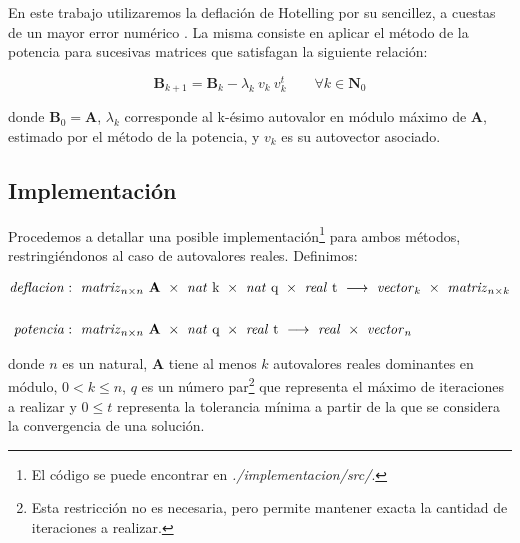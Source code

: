 En este trabajo utilizaremos la deflación de Hotelling por su sencillez, a cuestas de un mayor error numérico \cite{Burden}. La misma consiste en aplicar el método de la potencia para sucesivas matrices que satisfagan la siguiente relación:

\vspace{1em}
\begin{equation} \label{deflacion}
    \mathbf{B}_{k+1} = \mathbf{B}_{k} - \lambda_k\ v_k\ v_k^t \qquad \forall k \in \mathbf{N}_0
\end{equation}

\vspace{2em}
\noindent donde $\mathbf{B}_0 = \mathbf{A}$, $\lambda_k$ corresponde al k-ésimo autovalor en módulo máximo de \textbf{A}, estimado por el método de la potencia, y $v_k$ es su autovector asociado.






\vspace{2em}
\subsection{Implementación} Procedemos a detallar una posible implementación\footnote{El código se puede encontrar en \textit{./implementacion/src/}.} para ambos métodos, restringiéndonos al caso de autovalores reales. Definimos:

\begin{align*}
    \text{\textit{deflacion}}&:\ \text{\textit{matriz}}_{n \times n}\ \mathbf{A}\ \times\ \text{\textit{nat} k}\ \times\ \text{\textit{nat} q}\ \times\ \text{\textit{real} t}\
    \longrightarrow\ \text{\textit{vector}}_k\ \times\ \text{\textit{matriz}}_{n \times k}
    \\ \\
    \text{\textit{potencia}}&:\ \text{\textit{matriz}}_{n \times n}\ \mathbf{A}\ \times\ \text{\textit{nat} q}\ \times\ \text{\textit{real} t}\ 
    \longrightarrow\ \text{\textit{real}}\ \times\ \text{\textit{vector}}_n
\end{align*}

\vspace{1em}
\noindent donde $n$ es un natural, \textbf{A} tiene al menos $k$ autovalores reales dominantes en módulo, $0 < k \leq n$, $q$ es un número par\footnote{Esta restricción no es necesaria, pero permite mantener exacta la cantidad de iteraciones a realizar.} que representa el máximo de iteraciones a realizar y $0 \leq t$ representa la tolerancia mínima a partir de la que se considera la convergencia de una solución. 

